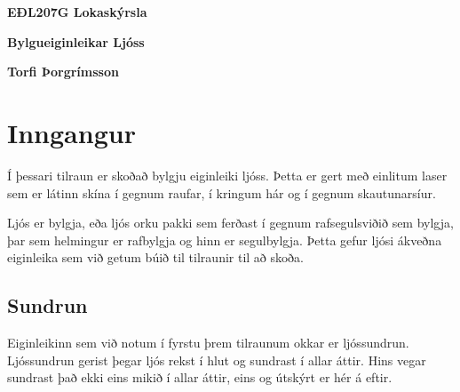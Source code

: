 \documentclass[12pt]{article}
\begin{document}
    
\centerline{\bf \Huge EÐL207G Lokaskýrsla}
\centerline{\bf \large Bylgueiginleikar Ljóss}
\centerline{\bf Torfi Þorgrímsson}

\tableofcontents
\newpage

\section{Inngangur}
Í þessari tilraun er skoðað bylgju eiginleiki ljóss. Þetta er gert með einlitum laser sem er látinn skína í gegnum raufar, í kringum hár og í gegnum skautunarsíur.

Ljós er bylgja, eða  ljós orku pakki sem ferðast í gegnum rafsegulsviðið sem bylgja, þar sem helmingur er rafbylgja og hinn er segulbylgja. Þetta gefur ljósi ákveðna eiginleika sem við getum búið til  tilraunir til að skoða.

\subsection{Sundrun}

Eiginleikinn sem við notum í fyrstu þrem tilraunum okkar er ljóssundrun. Ljóssundrun gerist þegar ljós rekst í hlut og sundrast í allar áttir. Hins vegar sundrast það ekki eins mikið í allar áttir, eins og útskýrt er hér á eftir. 
\end{document}
